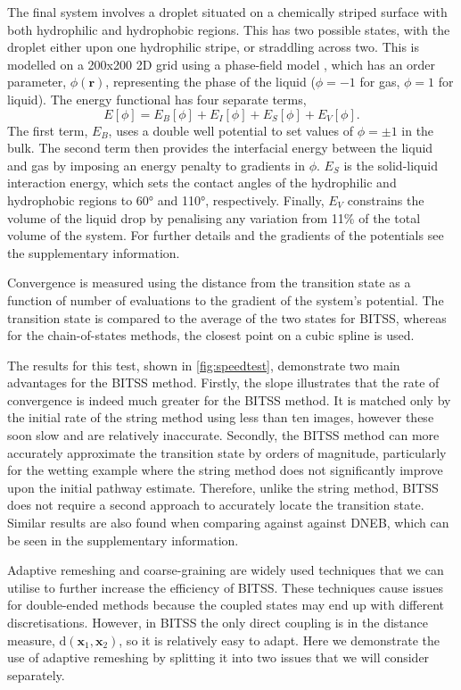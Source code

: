 \documentclass[aps,prl,twocolumn,groupedaddress]{revtex4}
\begin{document}
\topic The final system involves a droplet situated on a chemically striped surface with both hydrophilic and hydrophobic regions.
This has two possible states, with the droplet either upon one hydrophilic stripe, or straddling across two.
This is modelled on a 200x200 2D grid using a phase-field model \cite{Panter2019b}, which has an order parameter, $\phi(\bm{r})$, representing the phase of the liquid ($\phi=-1$ for gas, $\phi=1$ for liquid).
The energy functional has four separate terms,
\begin{equation} \label{eq:phasefield}
  E[\phi] = E_B[\phi] + E_I[\phi] + E_S[\phi] + E_V[\phi].
\end{equation}
The first term, $E_B$, uses a double well potential to set values of $\phi=\pm1$ in the bulk.
The second term then provides the interfacial energy between the liquid and gas by imposing an energy penalty to gradients in $\phi$.
$E_S$ is the solid-liquid interaction energy, which sets the contact angles of the hydrophilic and hydrophobic regions to 60\si{\degree} and 110\si{\degree}, respectively.
Finally, $E_V$ constrains the volume of the liquid drop by penalising any variation from 11\% of the total volume of the system.
For further details and the gradients of the potentials see the supplementary information.

\topic Convergence is measured using the distance from the transition state as a function of number of evaluations to the gradient of the system's potential.
The transition state is compared to the average of the two states for BITSS, whereas for the chain-of-states methods, the closest point on a cubic spline is used.

\topic The results for this test, shown in \cref{fig:speedtest}, demonstrate two main advantages for the BITSS method.
Firstly, the slope illustrates that the rate of convergence is indeed much greater for the BITSS method.
It is matched only by the initial rate of the string method using less than ten images, however these soon slow and are relatively inaccurate.
Secondly, the BITSS method can more accurately approximate the transition state by orders of magnitude, particularly for the wetting example where the string method does not significantly improve upon the initial pathway estimate.
Therefore, unlike the string method, BITSS does not require a second approach to accurately locate the transition state.
Similar results are also found when comparing against against DNEB, which can be seen in the supplementary information.


\topic Adaptive remeshing and coarse-graining are widely used techniques that we can utilise to further increase the efficiency of BITSS.
These techniques cause issues for double-ended methods because the coupled states may end up with different discretisations.
However, in BITSS the only direct coupling is in the distance measure, $\mathrm{d}(\bm{x}_1,\bm{x}_2)$, so it is relatively easy to adapt.
Here we demonstrate the use of adaptive remeshing by splitting it into two issues that we will consider separately.
\end{document}
